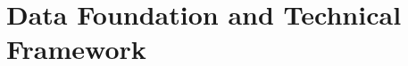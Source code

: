 \documentclass[conference]{IEEEconf}
\begin{document}
\section{Data Foundation and Technical Framework}
\end{document}
